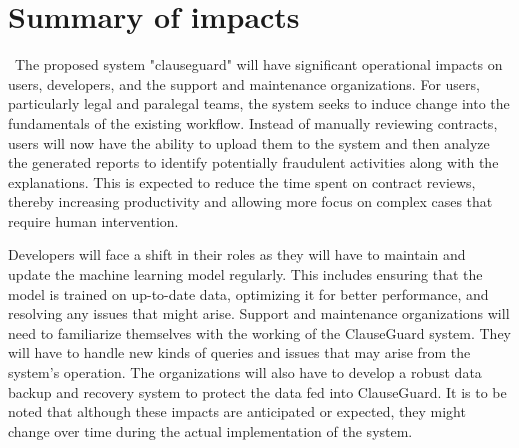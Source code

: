 \chapter{Summary of impacts \\
\label{Chapter::Summary of impacts}}\
The proposed system "clauseguard" will have significant operational impacts on users, developers, and the support and maintenance organizations. 
For users, particularly legal and paralegal teams, the system seeks to induce change into the fundamentals of the existing workflow. Instead of manually reviewing contracts, users will now have the ability to upload them to the system and then analyze the generated reports to identify potentially fraudulent activities along with the explanations. This is expected to reduce the time spent on contract reviews, thereby increasing productivity and allowing more focus on complex cases that require human intervention.

Developers will face a shift in their roles as they will have to maintain and update the machine learning model regularly. This includes ensuring that the model is trained on up-to-date data, optimizing it for better performance, and resolving any issues that might arise.
Support and maintenance organizations will  need to familiarize themselves with the working of the ClauseGuard system. They will have to handle new kinds of queries and issues that may arise from the system's operation. The organizations will also have to develop a robust data backup and recovery system to protect the data fed into ClauseGuard.
It is to be noted that although these impacts are anticipated or expected, they might change over time during the actual implementation of the system.







